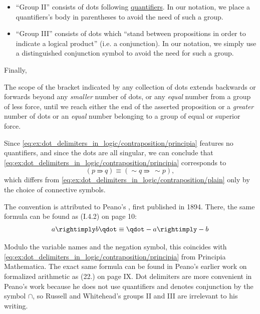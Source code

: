 \begin{example}
\begin{thmenum}
\begin{itemize}
      \item \enquote{Group II} consists of dots following \hyperref[con:predicate_logic/quantifiers]{quantifiers}. In our notation, we place a quantifiers's body in parentheses to avoid the need of such a group.

      \item \enquote{Group III} consists of dots which \enquote{stand between propositions in order to indicate a logical product} (i.e. a conjunction). In our notation, we simply use a distinguished conjunction symbol to avoid the need for such a group.
    \end{itemize}

    Finally,
    \begin{displayquote}
      The scope of the bracket indicated by any collection of dots extends backwards or forwards beyond any \textit{smaller} number of dots, or any \textit{equal} number from a group of less force, until we reach either the end of the asserted proposition or a \textit{greater} number of dots or an \textit{equal} number belonging to a group of equal or superior force.
    \end{displayquote}

    Since \eqref{eq:ex:dot_delimiters_in_logic/contraposition/principia} features no quantifiers, and since the dots are all singular, we can conclude that \eqref{eq:ex:dot_delimiters_in_logic/contraposition/principia} corresponds to
    \begin{equation}\label{eq:ex:dot_delimiters_in_logic/contraposition/principia_parens}
      (p \rightimply q) \equiv (\sim q \rightimply \ \sim p),
    \end{equation}
    which differs from \eqref{eq:ex:dot_delimiters_in_logic/contraposition/plain} only by the choice of connective symbols.

    The convention is attributed to Peano's \cite{Peano1908FormulatioMathematico}, first published in 1894. There, the same formula can be found as (I.4.2) on page 10:
    \begin{equation}\label{eq:ex:dot_delimiters_in_logic/contraposition/peano}
      a \rightimply b \qdot \equiv \qdot - a \rightimply - b
    \end{equation}

    Modulo the variable names and the negation symbol, this coincides with \eqref{eq:ex:dot_delimiters_in_logic/contraposition/principia} from Principia Mathematica. The exact same formula can be found in Peano's earlier work \cite{Peano1889ArithmeticesPrincipia} on formalized arithmetic as (22.) on page IX. Dot delimiters are more convenient in Peano's work because he does not use quantifiers and denotes conjunction by the symbol \( {\cap} \), so Russell and Whitehead's groups II and III are irrelevant to his writing.


\end{thmenum}
\end{example}
